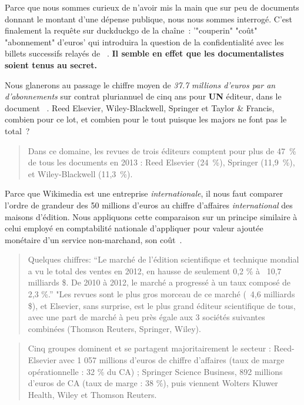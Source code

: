 Parce que nous sommes curieux de n'avoir mis la main que sur peu de documents donnant le montant d'une dépense publique, nous nous sommes interrogé.
C'est finalement la requête sur duckduckgo de la chaîne~: '"couperin" "coût" "abonnement" d'euros' qui introduira la question de la confidentialité avec les billets successifs relayés de \citeauthor{francois_renaville_daniel_2014}~\cite{francois_renaville_daniel_2014,savoirscom1_si_2014}.
\textbf{Il semble en effet que les documentalistes soient tenus au secret.}

Nous glanerons au passage le chiffre moyen de \emph{37.7 millions d'euros par an d'abonnements} sur contrat pluriannuel de cinq ans pour \textbf{UN} éditeur, dans le document ~\cite{couperin_negociation_2014}.
Reed Elsevier, Wiley-Blackwell, Springer et Taylor \& Francis, combien pour ce lot, et combien pour le tout puisque les majors ne font pas le total~?
\blockcquote{acfas_loligopole_2015}{
Dans ce domaine, les revues de trois éditeurs comptent pour plus de 47~\% de tous les documents en 2013 : Reed Elsevier (24~\%), Springer (11,9~\%), et Wiley-Blackwell (11,3~\%).
}

Parce que Wikimedia est une entreprise \emph{internationale}, il nous faut comparer l'ordre de grandeur des 50 millions d'euros au chiffre d'affaires \emph{international} des maisons d'édition.
Nous appliquons cette comparaison sur un principe similaire à celui employé en comptabilité nationale d'appliquer pour valeur ajoutée monétaire d'un service non-marchand, son coût~\cite{piriou_comptabilite_2004}.

\blockcquote[traduction]{esposito_snapshot_2013}{
Quelques chiffres: ``Le marché de l'édition scientifique et technique mondial a vu le total des ventes en 2012, en hausse de seulement 0,2 \% à \ 10,7 milliards \$. De 2010 à 2012, le marché a progressé à un taux composé de 2,3 \%.'' "Les revues sont le plus gros morceau de ce marché (\ 4,6 milliards \$), et Elsevier, sans surprise, est le plus grand éditeur scientifique de tous, avec une part de marché à peu près égale aux 3 sociétés suivantes combinées (Thomson Reuters, Springer, Wiley). %
}
\blockcquote{chartron_scenarios_2013}{
Cinq groupes dominent et se partagent majoritairement le secteur : Reed-Elsevier avec 1 057 millions d’euros de chiffre d’affaires (taux de marge opérationnelle : 32 \% du CA) ; Springer Science Business, 892 millions d’euros de CA (taux de marge : 38 \%), puis viennent Wolters Kluwer Health, Wiley et Thomson Reuters.
}

